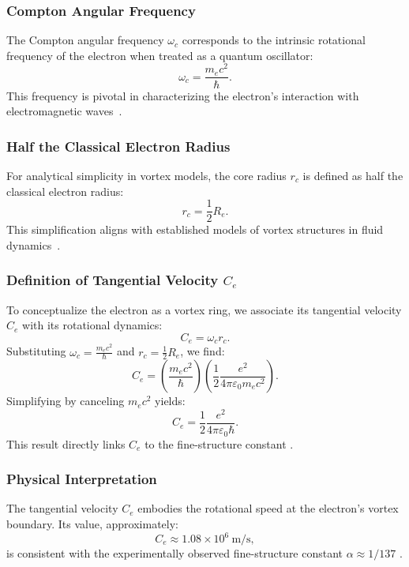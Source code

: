 \subsubsection{Compton Angular Frequency}
The Compton angular frequency $\omega_c$ corresponds to the intrinsic rotational frequency of the electron when treated as a quantum oscillator:
\begin{equation}
    \omega_c = \frac{m_e c^2}{\hbar}.
\end{equation}
This frequency is pivotal in characterizing the electron’s interaction with electromagnetic waves~\cite{kelvin1867}.

\subsubsection{Half the Classical Electron Radius}
For analytical simplicity in vortex models, the core radius $r_c$ is defined as half the classical electron radius:
\begin{equation}
    r_c = \frac{1}{2} R_e.
\end{equation}
This simplification aligns with established models of vortex structures in fluid dynamics~\cite{kleckner2013}.

\subsubsection{Definition of Tangential Velocity $C_e$}
To conceptualize the electron as a vortex ring, we associate its tangential velocity $C_e$ with its rotational dynamics:
\begin{equation}
    C_e = \omega_c r_c.
\end{equation}
Substituting $\omega_c = \frac{m_e c^2}{\hbar}$ and $r_c = \frac{1}{2} R_e$, we find:
\begin{equation}
    C_e = \left( \frac{m_e c^2}{\hbar} \right) \left( \frac{1}{2} \frac{e^2}{4\pi \varepsilon_0 m_e c^2} \right).\label{eq:equation}
\end{equation}
Simplifying by canceling $m_e c^2$ yields:
\begin{equation}
    C_e = \frac{1}{2} \frac{e^2}{4\pi \varepsilon_0 \hbar}.
\end{equation}
This result directly links $C_e$ to the fine-structure constant \cite{vinen2024}.

\subsubsection{Physical Interpretation}
The tangential velocity $C_e$ embodies the rotational speed at the electron’s vortex boundary. Its value, approximately:
\begin{equation}
    C_e \approx 1.08 \times 10^6 \ \text{m/s},
\end{equation}
is consistent with the experimentally observed fine-structure constant $\alpha \approx 1/137$ \cite{ricca1998}.

